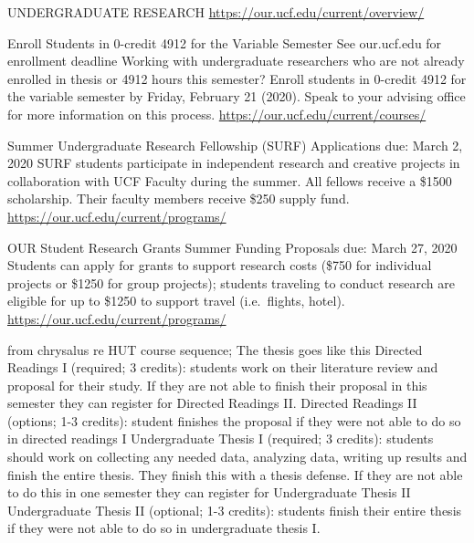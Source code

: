 \documentclass[
]{book}
\begin{document}
UNDERGRADUATE RESEARCH
\url{https://our.ucf.edu/current/overview/}

Enroll Students in 0-credit 4912 for the Variable Semester
See our.ucf.edu for enrollment deadline
Working with undergraduate researchers who are not already enrolled in thesis or 4912 hours this semester? Enroll students in 0-credit 4912 for the variable semester by Friday, February 21 (2020). Speak to your advising office for more information on this process.
\url{https://our.ucf.edu/current/courses/}

Summer Undergraduate Research Fellowship (SURF)
Applications due: March 2, 2020
SURF students participate in independent research and creative projects in collaboration with UCF Faculty during the summer. All fellows receive a \$1500 scholarship. Their faculty members receive \$250 supply fund.
\url{https://our.ucf.edu/current/programs/}

OUR Student Research Grants Summer Funding
Proposals due: March 27, 2020
Students can apply for grants to support research costs (\$750 for individual projects or \$1250 for group projects); students traveling to conduct research are eligible for up to \$1250 to support travel (i.e.~flights, hotel).
\url{https://our.ucf.edu/current/programs/}

from chrysalus re HUT course sequence;
The thesis goes like this
Directed Readings I (required; 3 credits): students work on their literature review and proposal for their study. If they are not able to finish their proposal in this semester they can register for Directed Readings II.
Directed Readings II (options; 1-3 credits): student finishes the proposal if they were not able to do so in directed readings I
Undergraduate Thesis I (required; 3 credits): students should work on collecting any needed data, analyzing data, writing up results and finish the entire thesis. They finish this with a thesis defense. If they are not able to do this in one semester they can register for Undergraduate Thesis II
Undergraduate Thesis II (optional; 1-3 credits): students finish their entire thesis if they were not able to do so in undergraduate thesis I.

  
\end{document}
